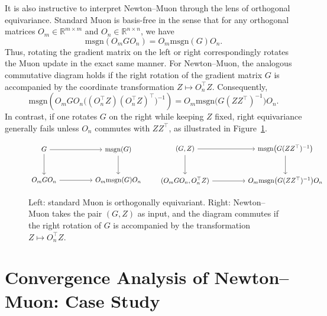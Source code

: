 \documentclass[11pt]{article}
\begin{document}
It is also instructive to interpret Newton--Muon through the lens of orthogonal equivariance. Standard Muon is basis-free in the sense that for any orthogonal matrices ${O}_m\in\mathbb{R}^{m\times m}$ and ${O}_n\in\mathbb{R}^{n\times n}$, we have
\[
\mathrm{msgn}({O}_m {G} {O}_n)={O}_m\mathrm{msgn}({G}){O}_n.
\]
Thus, rotating the gradient matrix on the left or right correspondingly rotates the Muon update in the exact same manner. For Newton--Muon, the analogous commutative diagram holds if the right rotation of the gradient matrix $G$ is accompanied by the coordinate transformation $Z\mapsto O_n^\top Z$. Consequently,
\[
\mathrm{msgn} \left({O}_m {G} {O}_n \big((O_n^\top Z)(O_n^\top Z)^\top\big)^{-1}\right)
=
{O}_m\mathrm{msgn}\big({G}({Z}{Z}^\top)^{-1}\big){O}_n.
\]
In contrast, if one rotates ${G}$ on the right while keeping ${Z}$ fixed, right equivariance generally fails unless ${O}_n$ commutes with ${Z}{Z}^\top$, as illustrated in Figure~\ref{fig:muon-newton-muon-equivariance}.



\begin{figure}[!htb]
\centering
\[
\begin{tikzcd}[column sep=huge, row sep=large]
G \arrow[r] \arrow[d]
& \mathrm{msgn}(G) \arrow[d] \\
{O}_m G {O}_n \arrow[r]
& {O}_m\mathrm{msgn}(G){O}_n
\end{tikzcd}
\qquad
\begin{tikzcd}[column sep=huge, row sep=large]
(G,Z) \arrow[r] \arrow[d]
& \mathrm{msgn}\big(G(ZZ^\top)^{-1}\big) \arrow[d] \\
({O}_m G {O}_n,{O}_n^\top Z) \arrow[r]
& {O}_m \mathrm{msgn}\big( G (ZZ^\top)^{-1}\big){O}_n
\end{tikzcd}
\]
\caption{Left: standard Muon is orthogonally equivariant. Right: Newton--Muon takes the pair $(G,Z)$ as input, and the diagram commutes if the right rotation of $G$ is accompanied by the transformation $Z\mapsto O_n^\top Z$.}
\label{fig:muon-newton-muon-equivariance}
\end{figure}


\section{Convergence Analysis of Newton--Muon: Case Study}
\label{sec:single-spike-convergence}
\end{document}
